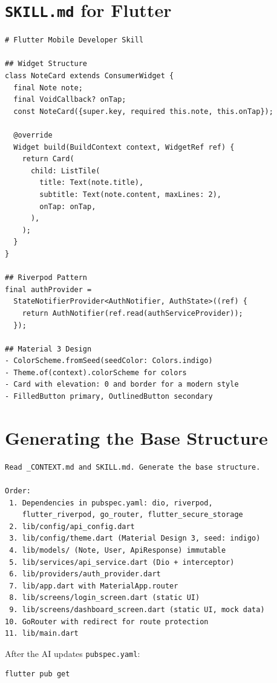 \section{\texttt{SKILL.md} for Flutter}

\begin{lstlisting}[language={},title={\texttt{SKILL.md} --- Flutter Mobile Developer}]
# Flutter Mobile Developer Skill

## Widget Structure
class NoteCard extends ConsumerWidget {
  final Note note;
  final VoidCallback? onTap;
  const NoteCard({super.key, required this.note, this.onTap});

  @override
  Widget build(BuildContext context, WidgetRef ref) {
    return Card(
      child: ListTile(
        title: Text(note.title),
        subtitle: Text(note.content, maxLines: 2),
        onTap: onTap,
      ),
    );
  }
}

## Riverpod Pattern
final authProvider =
  StateNotifierProvider<AuthNotifier, AuthState>((ref) {
    return AuthNotifier(ref.read(authServiceProvider));
  });

## Material 3 Design
- ColorScheme.fromSeed(seedColor: Colors.indigo)
- Theme.of(context).colorScheme for colors
- Card with elevation: 0 and border for a modern style
- FilledButton primary, OutlinedButton secondary
\end{lstlisting}

\section{Generating the Base Structure}

\begin{praticabox}[title={Hands-on --- Generate the app with Copilot}]
\begin{lstlisting}[language={}]
Read _CONTEXT.md and SKILL.md. Generate the base structure.

Order:
 1. Dependencies in pubspec.yaml: dio, riverpod,
    flutter_riverpod, go_router, flutter_secure_storage
 2. lib/config/api_config.dart
 3. lib/config/theme.dart (Material Design 3, seed: indigo)
 4. lib/models/ (Note, User, ApiResponse) immutable
 5. lib/services/api_service.dart (Dio + interceptor)
 6. lib/providers/auth_provider.dart
 7. lib/app.dart with MaterialApp.router
 8. lib/screens/login_screen.dart (static UI)
 9. lib/screens/dashboard_screen.dart (static UI, mock data)
10. GoRouter with redirect for route protection
11. lib/main.dart
\end{lstlisting}
After the AI updates \texttt{pubspec.yaml}:
\begin{lstlisting}[language=bash]
flutter pub get
\end{lstlisting}
\end{praticabox}

